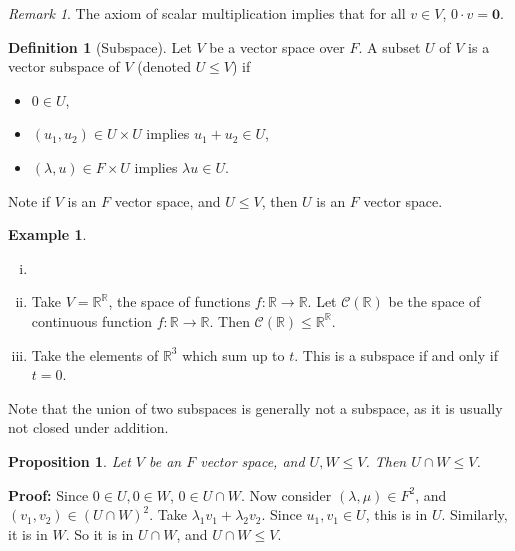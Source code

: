 \documentclass[12pt]{article}
\newtheorem{proposition}{Proposition}[section]
\theoremstyle{definition}
\newtheorem{definition}{Definition}[section]
\newtheorem{example}{Example}[section]
\theoremstyle{remark}
\newtheorem*{remark}{Remark}
\begin{document}
\begin{remark}
	The axiom of scalar multiplication implies that for all $v \in V$, $0 \cdot v = \mathbf{0}$.
\end{remark}

\begin{definition}[Subspace]
	Let $V$ be a vector space over $F$. A subset $U$ of $V$ is a vector subspace of $V$ (denoted $U \leq V$) if
	\begin{itemize}
		\item $0 \in U$,
		\item $(u_1, u_2) \in U \times U$ implies $u_1 + u_2 \in U$,
		\item $(\lambda, u) \in F \times U$ implies $\lambda u \in U$.
	\end{itemize}
\end{definition}
Note if $V$ is an $F$ vector space, and $U \leq V$, then $U$ is an $F$ vector space.

\begin{adjustbox}{minipage = \columnwidth - 25.5pt, margin=1em, frame=1pt, margin=0em}
\begin{example}
	\begin{enumerate}[(i)]
		\item[]
		\item Take $V = \mathbb{R}^{\mathbb{R}}$, the space of functions $f : \mathbb{R} \to \mathbb{R}$. Let $\mathcal{C}(\mathbb{R})$ be the space of continuous function $f : \mathbb{R} \to \mathbb{R}$. Then $\mathcal{C}(\mathbb{R}) \leq \mathbb{R}^{\mathbb{R}}$.
		\item Take the elements of $\mathbb{R}^3$ which sum up to $t$. This is a subspace if and only if $t = 0$.
	\end{enumerate}	
\end{example}

\end{adjustbox}

Note that the union of two subspaces is generally not a subspace, as it is usually not closed under addition.

\begin{proposition}
	Let $V$ be an $F$ vector space, and $U, W \leq V$. Then $U \cap W \leq V$.
\end{proposition}

\begin{adjustbox}{minipage = \columnwidth - 25.5pt, margin=1em, frame=1pt, margin=0em}
	\textbf{Proof:} Since $0 \in U, 0 \in W$, $0 \in U \cap W$. Now consider $(\lambda, \mu) \in F^2$, and $(v_1, v_2) \in (U \cap W)^2$. Take $\lambda_1 v_1 + \lambda_2 v_2$. Since $u_1,v_1 \in U$, this is in $U$. Similarly, it is in $W$. So it is in $U \cap W$, and $U \cap W \leq V$.
\end{adjustbox}
\end{document}
